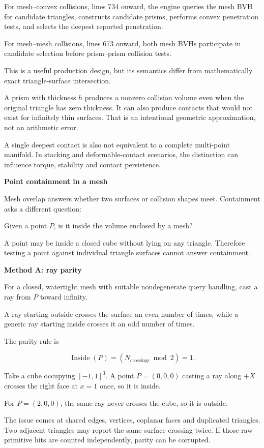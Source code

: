 For mesh--convex collisions, lines 734 onward, the engine queries the mesh BVH for candidate triangles, constructs candidate prisms, performs convex penetration tests, and selects the deepest reported penetration.

For mesh--mesh collisions, lines 673 onward, both mesh BVHs participate in candidate selection before prism--prism collision tests.

This is a useful production design, but its semantics differ from mathematically exact triangle-surface intersection.

A prism with thickness \(h\) produces a nonzero collision volume even when the original triangle has zero thickness. It can also produce contacts that would not exist for infinitely thin surfaces. That is an intentional geometric approximation, not an arithmetic error.

A single deepest contact is also not equivalent to a complete multi-point manifold. In stacking and deformable-contact scenarios, the distinction can influence torque, stability and contact persistence.

\textbf{Point containment in a mesh}

Mesh overlap answers whether two surfaces or collision shapes meet. Containment asks a different question:

Given a point \(P\), is it inside the volume enclosed by a mesh?

A point may be inside a closed cube without lying on any triangle. Therefore testing a point against individual triangle surfaces cannot answer containment.

\textbf{Method A: ray parity}

For a closed, watertight mesh with suitable nondegenerate query handling, cast a ray from \(P\) toward infinity.

A ray starting outside crosses the surface an even number of times, while a generic ray starting inside crosses it an odd number of times.

The parity rule is

\[
\operatorname{Inside}(P)=(N_{\text{crossings}}\bmod2)=1.
\]

Take a cube occupying \([-1,1]^3\). A point \(P=(0,0,0)\) casting a ray along \(+X\) crosses the right face at \(x=1\) once, so it is inside.

For \(P=(2,0,0)\), the same ray never crosses the cube, so it is outside.

The issue comes at shared edges, vertices, coplanar faces and duplicated triangles. Two adjacent triangles may report the same surface crossing twice. If those raw primitive hits are counted independently, parity can be corrupted.

